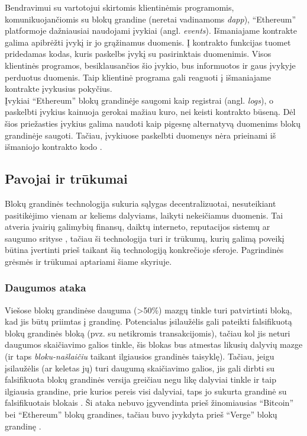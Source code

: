 Bendravimui su vartotojui skirtomis klientinėmis programomis, komunikuojančiomis su blokų grandine (neretai vadinamoms \textit{dapp}), \enquote{Ethereum} platformoje dažniausiai naudojami
įvykiai (angl. \textit{events}). Išmaniajame kontrakte galima apibrėžti įvykį ir jo grąžinamus duomenis. Į kontrakto funkcijas tuomet
pridedamas kodas, kuris paskelbs įvykį su pasirinktais duomenimis. Visos klientinės programos,
besiklausančios šio įvykio, bus informuotos ir gaus įvykyje perduotus duomenis. Taip klientinė programa gali reaguoti į išmaniajame
kontrakte įvykusius pokyčius.\\
Įvykiai \enquote{Ethereum} blokų grandinėje saugomi kaip registrai (angl. \textit{logs}), o paskelbti įvykius kainuoja gerokai mažiau kuro,
nei keisti kontrakto būseną. Dėl šios priežasties įvykius galima naudoti kaip pigesnę alternatyvą duomenims blokų grandinėje saugoti. Tačiau, įvykiuose paskelbti
duomenys nėra prieinami iš išmaniojo kontrakto kodo \cite{EthereumWhitePaper}.

\subsection{Pavojai ir trūkumai} \label{blockchain:concerns}

Blokų grandinės technologija sukuria sąlygas decentralizuotai, nesuteikiant pasitikėjimo vienam ar keliems dalyviams, laikyti nekeičiamus duomenis.
Tai atveria įvairių galimybių finansų, daiktų interneto, reputacijos sistemų ar saugumo srityse \cite{Zheng2017}, tačiau ši technologija turi ir trūkumų,
kurių galimą poveikį būtina įvertinti prieš taikant šią technologiją konkrečioje sferoje. Pagrindinės grėsmės ir trūkumai aptariami šiame skyriuje.

\subsubsection{Daugumos ataka}

Viešose blokų grandinėse dauguma (>50\%) mazgų tinkle turi patvirtinti bloką, kad jis būtų priimtas į grandinę. Potencialus įsilaužėlis gali pateikti
falsifikuotą blokų grandinės bloką (pvz. su netikromis transakcijomis), tačiau kol jis neturi daugumos skaičiavimo galios tinkle, šis blokas bus
atmestas likusių dalyvių mazge (ir taps \textit{bloku-našlaičiu} taikant ilgiausios grandinės taisyklę). Tačiau, jeigu įsilaužėlis (ar keletas jų)
turi daugumą skaičiavimo galios, jis gali dirbti su falsifikuota blokų grandinės versija greičiau negu likę dalyviai tinkle ir taip ilgiausia grandine, prie kurios
pereis visi dalyviai, taps jo sukurta grandinė su falsifikuotais blokais \cite{Zheng2017}. Ši ataka nebuvo įgyvendinta prieš žinomiausias \enquote{Bitcoin} bei \enquote{Ethereum} blokų grandines, tačiau
buvo įvykdyta prieš \enquote{Verge} blokų grandinę \cite{Sedgwick2018}.

